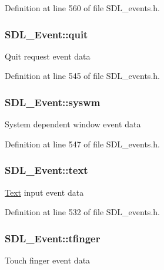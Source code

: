 Definition at line 560 of file S\-D\-L\-\_\-events.\-h.

\hypertarget{union_s_d_l___event_a102a3008afe67a1c02ae7504e232dcef}{
\subsubsection[{quit}]{ S\-D\-L\-\_\-\-Event\-::quit}}\label{union_s_d_l___event_a102a3008afe67a1c02ae7504e232dcef}
Quit request event data 

Definition at line 545 of file S\-D\-L\-\_\-events.\-h.

\hypertarget{union_s_d_l___event_ab3b2eaf5348d4c50a51b1f297fdef537}{
\subsubsection[{syswm}]{ S\-D\-L\-\_\-\-Event\-::syswm}}\label{union_s_d_l___event_ab3b2eaf5348d4c50a51b1f297fdef537}
System dependent window event data 

Definition at line 547 of file S\-D\-L\-\_\-events.\-h.

\hypertarget{union_s_d_l___event_aa4fc65c559d69f33c057c0c23d8414b8}{
\subsubsection[{text}]{ S\-D\-L\-\_\-\-Event\-::text}}\label{union_s_d_l___event_aa4fc65c559d69f33c057c0c23d8414b8}
\hyperlink{class_text}{Text} input event data 

Definition at line 532 of file S\-D\-L\-\_\-events.\-h.

\hypertarget{union_s_d_l___event_ab18d7d60794cb056948ffa58541bc3c5}{
\subsubsection[{tfinger}]{ S\-D\-L\-\_\-\-Event\-::tfinger}}\label{union_s_d_l___event_ab18d7d60794cb056948ffa58541bc3c5}
Touch finger event data 

